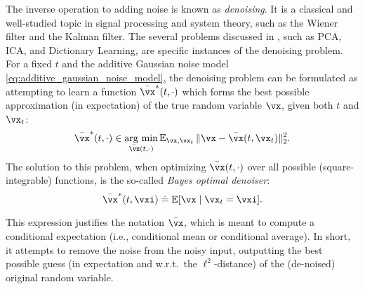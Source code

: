 \documentclass[../../book-main.tex]{subfiles}
\begin{document}
The inverse operation to adding noise is known as \textit{denoising}. It is a classical and well-studied topic in signal processing and system theory, such as the Wiener filter and the Kalman filter. The several problems discussed in , such as PCA, ICA, and Dictionary Learning, are specific instances of the denoising problem. For a fixed \(t\) and the additive Gaussian noise model \eqref{eq:additive_gaussian_noise_model}, the denoising problem can be formulated as attempting to learn a function \(\bar{\vx}^{\ast}(t, \cdot)\) which forms the best possible approximation (in expectation) of the true random variable \(\vx\), given both \(t\) and \(\vx_{t}\):
\begin{equation}\label{eq:denoising_loss}
	\bar{\vx}^{\ast}(t, \cdot) \in \argmin_{\bar{\vx}(t, \cdot)}\Ex_{\vx, \vx_{t}}\norm{\vx - \bar{\vx}(t, \vx_{t})}_{2}^{2}.
\end{equation}
The solution to this problem, when optimizing \(\bar{\vx}(t, \cdot)\) over all possible (square-integrable) functions, is the so-called \textit{Bayes optimal denoiser}: 
\begin{equation}\label{eq:optimal_denoiser}
	\bar{\vx}^{\ast}(t, \vxi) \doteq \Ex[\vx \mid \vx_{t} = \vxi].
\end{equation}

This expression justifies the notation \(\bar{\vx}\), which is meant to compute a conditional expectation (i.e., conditional mean or conditional average). In short, it attempts to remove the noise from the noisy input, outputting the best possible guess (in expectation and w.r.t.~the \(\ell^{2}\)-distance) of the (de-noised) original random variable.
\end{document}
